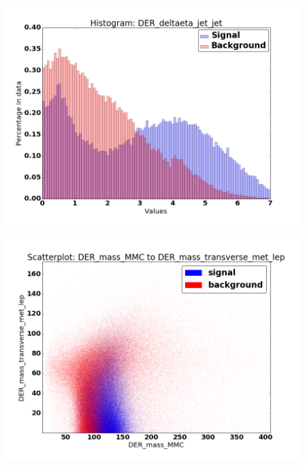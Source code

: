 \begin{figure}[h]
\centering
\begin{minipage}{.5\textwidth}
  \centering
  \includegraphics[width=\linewidth]{images/hist_DER_deltaeta_jet_jet}
  \label{fig:hist1}
\end{minipage}%
\begin{minipage}{.5\textwidth}
  \centering
  \includegraphics[width=\linewidth]{images/scat_DER_mass_MMCtoDER_mass_transverse_met_lep}
  \label{fig:scat1}
\end{minipage}
\end{figure}

